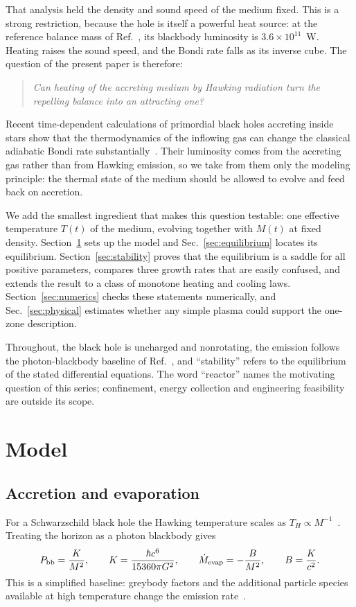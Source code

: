 \documentclass[11pt,a4paper]{article}
\newcommand{\Pbb}{P_{\mathrm{bb}}}
\begin{document}
That analysis held the density and sound speed of the medium fixed. This is a strong restriction, because the hole is itself a powerful heat source: at the reference balance mass of Ref.~\cite{paperI}, its blackbody luminosity is $3.6\times10^{11}$~W. Heating raises the sound speed, and the Bondi rate falls as its inverse cube. The question of the present paper is therefore:
\begin{quote}
\itshape Can heating of the accreting medium by Hawking radiation turn the repelling balance into an attracting one?
\end{quote}

Recent time-dependent calculations of primordial black holes accreting inside stars show that the thermodynamics of the inflowing gas can change the classical adiabatic Bondi rate substantially~\cite{cantiello}. Their luminosity comes from the accreting gas rather than from Hawking emission, so we take from them only the modeling principle: the thermal state of the medium should be allowed to evolve and feed back on accretion.

We add the smallest ingredient that makes this question testable: one effective temperature $T(t)$ of the medium, evolving together with $M(t)$ at fixed density. Section~\ref{sec:model} sets up the model and Sec.~\ref{sec:equilibrium} locates its equilibrium. Section~\ref{sec:stability} proves that the equilibrium is a saddle for all positive parameters, compares three growth rates that are easily confused, and extends the result to a class of monotone heating and cooling laws. Section~\ref{sec:numerics} checks these statements numerically, and Sec.~\ref{sec:physical} estimates whether any simple plasma could support the one-zone description.

Throughout, the black hole is uncharged and nonrotating, the emission follows the photon-blackbody baseline of Ref.~\cite{paperI}, and ``stability'' refers to the equilibrium of the stated differential equations. The word ``reactor'' names the motivating question of this series; confinement, energy collection and engineering feasibility are outside its scope.

\section{Model}\label{sec:model}
\subsection{Accretion and evaporation}
For a Schwarzschild black hole the Hawking temperature scales as $T_H\propto M^{-1}$~\cite{hawking}. Treating the horizon as a photon blackbody gives
\begin{equation*}
 \Pbb=\frac{K}{M^2},\qquad K=\frac{\hbar c^6}{15360\pi G^2},\qquad
 \dot M_{\rm evap}=-\frac{B}{M^2},\qquad B=\frac{K}{c^2}.
\end{equation*}
This is a simplified baseline: greybody factors and the additional particle species available at high temperature change the emission rate~\cite{page,macgibbon}.
\end{document}
